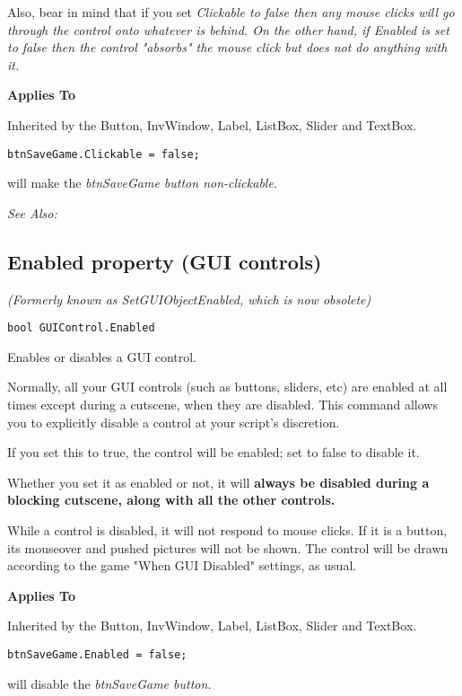 Also, bear in mind that if you set \it{Clickable} to false then any mouse clicks will go through the control
onto whatever is behind. On the other hand, if \it{Enabled} is set to false then the control "absorbs"
the mouse click but does not do anything with it.

\bf{Applies To}

Inherited by the Button, InvWindow, Label, ListBox, Slider and TextBox.

\begin{verbatim}
btnSaveGame.Clickable = false;
\end{verbatim}
will make the \it{btnSaveGame} button non-clickable.

\it{See Also:} 


\subsection{Enabled property (GUI controls)}\label{GUIControl.Enabled}%

\it{(Formerly known as SetGUIObjectEnabled, which is now obsolete)}

\begin{verbatim}
bool GUIControl.Enabled
\end{verbatim}
Enables or disables a GUI control.

Normally, all your GUI controls (such as buttons, sliders, etc) are enabled at all times
except during a cutscene, when they are disabled. This command allows you to explicitly
disable a control at your script's discretion.

If you set this to true, the control will be enabled; set to false to disable it.

Whether you set it as enabled or not, it will \bf{always} be disabled during a blocking
cutscene, along with all the other controls.

While a control is disabled, it will not respond to mouse clicks. If it is a button, its
mouseover and pushed pictures will not be shown. The control will be drawn according to
the game "When GUI Disabled" settings, as usual.

\bf{Applies To}

Inherited by the Button, InvWindow, Label, ListBox, Slider and TextBox.

\begin{verbatim}
btnSaveGame.Enabled = false;
\end{verbatim}
will disable the \it{btnSaveGame} button.

